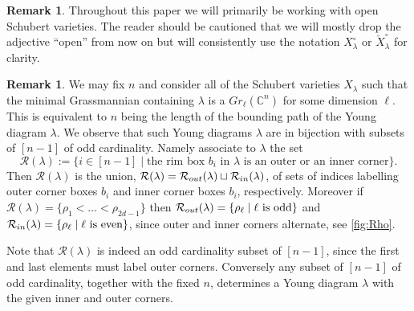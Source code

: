 \documentclass{amsart}
\theoremstyle{definition}
\newtheorem{remark}[thm]{Remark}
\numberwithin{equation}{section}
\newcommand{\Rout}{\mathcal R_{\rm{out}}}
\newcommand{\Rin}{\mathcal R_{\rm{in}}}
\newcommand{\C}{\mathbb{C}}
\newcommand{\opencheckSchub}{{\check{X}_{\lambda}^{\circ}}}
\begin{document}
\begin{remark}
Throughout this paper we will primarily be working with open Schubert 
varieties.  The reader should be cautioned that 
we will mostly drop the adjective ``open'' from now on but will consistently use the notation 
$X_{\lambda}^\circ$ 
or $\opencheckSchub$ 
	for clarity.
\end{remark}

\begin{remark}\label{r:R(lambda)} We may fix $n$ and consider all of the Schubert varieties $X_\lambda$ such that the minimal Grassmannian containing $\lambda$ is a $Gr_{\ell}(\C^n)$ for some dimension $\ell$. This is equivalent to $n$ being the length of the bounding path of the Young diagram $\lambda$. We observe that such Young diagrams $\lambda$ are in bijection with  subsets of $[n-1]$ of odd cardinality.  Namely
associate to $\lambda$ the set
\[
\mathcal R(\lambda):=\{i\in [n-1]\mid \text{the rim box $b_i$ in $\lambda$ is an outer or an inner corner}\}.
\] 
	Then $\mathcal R(\lambda)$ is the union, $\mathcal R(\lambda)=\Rout(\lambda)\sqcup \Rin(\lambda)$, of sets of indices labelling outer corner boxes $b_i$ and inner corner boxes $b_i$, respectively. Moreover 
	if 
	$\mathcal R(\lambda)=\{\rho_1<\dotsc < \rho_{2d-1}\}$ then $\Rout(\lambda)=\{\rho_{\ell}\mid \text {$\ell$ is odd}\}$ and $\Rin(\lambda)=\{\rho_{\ell}\mid \text {$\ell$ is even}\}$, since outer and inner corners alternate, see \cref{fig:Rho}.
 
Note that $\mathcal R(\lambda)$ is indeed an odd cardinality subset of  $[n-1]$, since the first and last elements must label outer corners. Conversely any subset of $[n-1]$ of odd cardinality, together with the fixed $n$, determines a Young diagram $\lambda$ with the given inner and outer corners.  
\end{remark}
\end{document}

